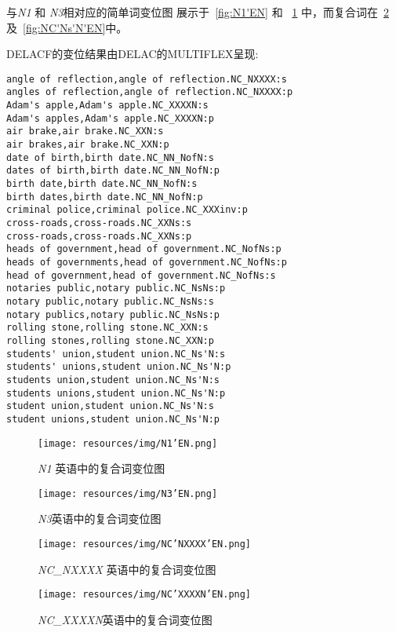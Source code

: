 \bigskip
\noindent 与\emph{N1} 和 \emph{N3}相对应的简单词变位图 展示于~\ref{fig:N1'EN} 和 ~\ref{fig:N3'EN} 中，而复合词在~\ref{fig:NC'NXXXX'EN} 及~\ref{fig:NC'Ns'N'EN}中。

\bigskip
\noindent DELACF的变位结果由DELAC的MULTIFLEX呈现:

\begin{verbatim}
angle of reflection,angle of reflection.NC_NXXXX:s
angles of reflection,angle of reflection.NC_NXXXX:p
Adam's apple,Adam's apple.NC_XXXXN:s
Adam's apples,Adam's apple.NC_XXXXN:p
air brake,air brake.NC_XXN:s
air brakes,air brake.NC_XXN:p
date of birth,birth date.NC_NN_NofN:s
dates of birth,birth date.NC_NN_NofN:p
birth date,birth date.NC_NN_NofN:s
birth dates,birth date.NC_NN_NofN:p
criminal police,criminal police.NC_XXXinv:p
cross-roads,cross-roads.NC_XXNs:s
cross-roads,cross-roads.NC_XXNs:p
heads of government,head of government.NC_NofNs:p
heads of governments,head of government.NC_NofNs:p
head of government,head of government.NC_NofNs:s
notaries public,notary public.NC_NsNs:p
notary public,notary public.NC_NsNs:s
notary publics,notary public.NC_NsNs:p
rolling stone,rolling stone.NC_XXN:s
rolling stones,rolling stone.NC_XXN:p
students' union,student union.NC_Ns'N:s
students' unions,student union.NC_Ns'N:p
students union,student union.NC_Ns'N:s
students unions,student union.NC_Ns'N:p
student union,student union.NC_Ns'N:s
student unions,student union.NC_Ns'N:p
\end{verbatim}
 
\begin{figure}[ht]
\begin{minipage}[c]{0.45\textwidth}
 \centering
 \texttt{[image: resources/img/N1'EN.png]}
 \caption{ \emph{N1} 英语中的复合词变位图}
  \label{fig:N1'EN}
\end{minipage}\hfill
\begin{minipage}[c]{0.5\textwidth}
 \centering
 \texttt{[image: resources/img/N3'EN.png]}
  \caption{\emph{N3}英语中的复合词变位图}
  \label{fig:N3'EN}
\end{minipage}
\end{figure}


\begin{figure}[!htb]
  \centering
  \texttt{[image: resources/img/NC'NXXXX'EN.png]}
  \caption{\emph{NC\_NXXXX} 英语中的复合词变位图}
  \label{fig:NC'NXXXX'EN}
\end{figure}

\begin{figure}[!htb]
  \centering
  \texttt{[image: resources/img/NC'XXXXN'EN.png]}
  \caption{\emph{NC\_XXXXN}英语中的复合词变位图}
  \label{fig:NC'XXXXN'EN}
\end{figure}

